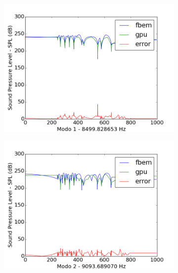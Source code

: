 \begin{figure}[ht]
\begin{subfigure}{0.5\textwidth}
	\includegraphics[width=\textwidth]{../data/transfer_test/steel_key/plots/steel_key-tfv-0_1.png}
	\label{fig:coef_key_1}
\end{subfigure}
\begin{subfigure}{0.5\textwidth}
	\centering
	\includegraphics[width=\textwidth]{../data/transfer_test/steel_key/plots/steel_key-tfv-0_2.png}
	\label{fig:coef_key_2}
\end{subfigure}%
\begin{subfigure}{0.5\textwidth}
	\centering

\end{subfigure}
\end{figure}
